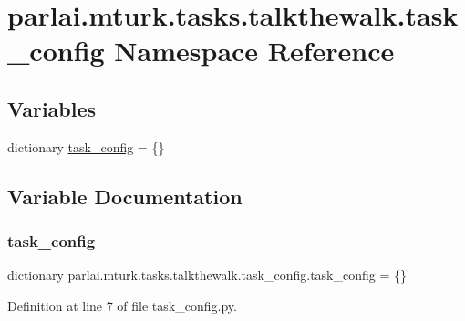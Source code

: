 \hypertarget{namespaceparlai_1_1mturk_1_1tasks_1_1talkthewalk_1_1task__config}{}\section{parlai.\+mturk.\+tasks.\+talkthewalk.\+task\+\_\+config Namespace Reference}
\label{namespaceparlai_1_1mturk_1_1tasks_1_1talkthewalk_1_1task__config}
\subsection*{Variables}
\begin{DoxyCompactItemize}
\item 
dictionary \hyperlink{namespaceparlai_1_1mturk_1_1tasks_1_1talkthewalk_1_1task__config_a4dbc5e180bd22c8ade287fa11efd05fb}{task\+\_\+config} = \{\}
\end{DoxyCompactItemize}


\subsection{Variable Documentation}
\mbox{\label{namespaceparlai_1_1mturk_1_1tasks_1_1talkthewalk_1_1task__config_a4dbc5e180bd22c8ade287fa11efd05fb}} 
\subsubsection{\texorpdfstring{task\+\_\+config}{task\_config}}
{\footnotesize\ttfamily dictionary parlai.\+mturk.\+tasks.\+talkthewalk.\+task\+\_\+config.\+task\+\_\+config = \{\}}



Definition at line 7 of file task\+\_\+config.\+py.

